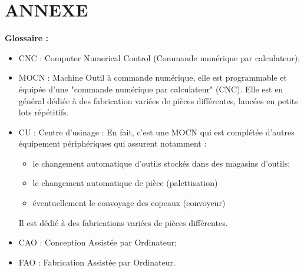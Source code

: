 \documentclass[12pt]{article}
\begin{document}
\section{ANNEXE}
\begin{tcolorbox}[colback=blue!5!white,colframe=orange!75!black]
\begin{center}
    \textbf{Glossaire :}
\end{center}
\begin{itemize}
    \item CNC : Computer Numerical Control (Commande numérique par calculateur);
    \item MOCN : Machine Outil à commande numérique, elle est programmable et équipée d'une "commande numérique par calculateur" (CNC). Elle est en général dédiée à des fabrication variées de pièces différentes, lancées en petits lots répétitifs.
    \item CU : Centre d'usinage : En fait, c'est une MOCN qui est complétée d'autres équipement périphériques qui assurent notamment : \begin{itemize}
        \item le changement automatique d'outils stockés dans des magasins d'outils;
        \item le changement automatique de pièce (palettisation)
        \item éventuellement le convoyage des copeaux (convoyeur)
    \end{itemize}
    Il est dédié à des fabrications variées de pièces différentes.
    \item CAO : Conception Assistée par Ordinateur;
    \item FAO : Fabrication Assistée par Ordinateur.
\end{itemize}
\end{tcolorbox}
\end{document}
